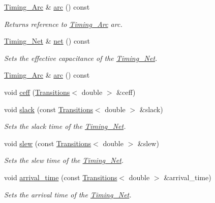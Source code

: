 \begin{DoxyCompactItemize}
\hyperlink{classTiming__Analysis_1_1Timing__Arc}{Timing\-\_\-\-Arc} \& \hyperlink{classTiming__Analysis_1_1Timing__Point_adfac3529231393d429f746d9e1f1bfb6}{arc} () const 
\begin{DoxyCompactList}\small\item\em Returns reference to \hyperlink{classTiming__Analysis_1_1Timing__Arc}{Timing\-\_\-\-Arc} arc. \end{DoxyCompactList}\item 
\hyperlink{classTiming__Analysis_1_1Timing__Net}{Timing\-\_\-\-Net} \& \hyperlink{classTiming__Analysis_1_1Timing__Point_aa63fa25bd56985d8deca58355c48867b}{net} () const 
\begin{DoxyCompactList}\small\item\em Sets the effective capacitance of the \hyperlink{classTiming__Analysis_1_1Timing__Net}{Timing\-\_\-\-Net}. \end{DoxyCompactList}\item 
\hyperlink{classTiming__Analysis_1_1Timing__Arc}{Timing\-\_\-\-Arc} \& \hyperlink{classTiming__Analysis_1_1Timing__Point_adfac3529231393d429f746d9e1f1bfb6}{arc} () const 
\item 
void \hyperlink{classTiming__Analysis_1_1Timing__Point_ab4f9a99d6dad95ec709f165f57478e66}{ceff} (\hyperlink{classTransitions}{Transitions}$<$ double $>$ \&ceff)
\item 
void \hyperlink{classTiming__Analysis_1_1Timing__Point_a18a4b15b4612ea98ebba0f1f1e25db18}{slack} (const \hyperlink{classTransitions}{Transitions}$<$ double $>$ \&slack)
\begin{DoxyCompactList}\small\item\em Sets the slack time of the \hyperlink{classTiming__Analysis_1_1Timing__Net}{Timing\-\_\-\-Net}. \end{DoxyCompactList}\item 
void \hyperlink{classTiming__Analysis_1_1Timing__Point_ac8040357b9d6e8bc62d2958b4ffb4da4}{slew} (const \hyperlink{classTransitions}{Transitions}$<$ double $>$ \&slew)
\begin{DoxyCompactList}\small\item\em Sets the slew time of the \hyperlink{classTiming__Analysis_1_1Timing__Net}{Timing\-\_\-\-Net}. \end{DoxyCompactList}\item 
void \hyperlink{classTiming__Analysis_1_1Timing__Point_a28f687613d6d4d9ec544f6b90c8d16e6}{arrival\-\_\-time} (const \hyperlink{classTransitions}{Transitions}$<$ double $>$ \&arrival\-\_\-time)
\begin{DoxyCompactList}\small\item\em Sets the arrival time of the \hyperlink{classTiming__Analysis_1_1Timing__Net}{Timing\-\_\-\-Net}. \end{DoxyCompactList}\item 

\end{DoxyCompactItemize}
